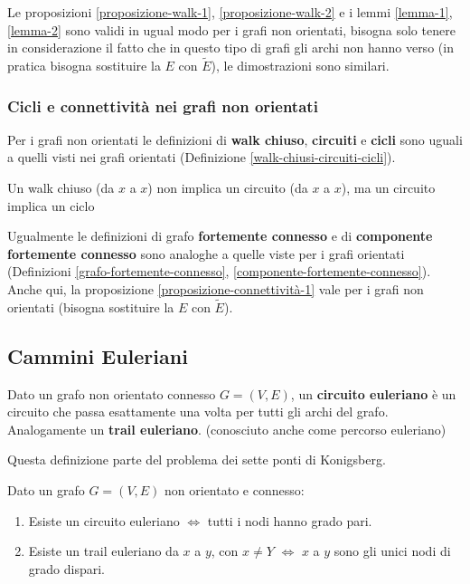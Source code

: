 Le proposizioni \ref{proposizione-walk-1}, \ref{proposizione-walk-2} e i lemmi \ref{lemma-1}, \ref{lemma-2}  sono validi in ugual modo per i grafi non orientati, bisogna solo tenere in considerazione il fatto che in questo tipo di grafi gli archi non hanno verso (in pratica bisogna sostituire la $E$ con $\widetilde{E}$), le dimostrazioni sono similari.

\subsubsection{Cicli e connettività nei grafi non orientati}
Per i grafi non orientati le definizioni di \textbf{walk chiuso}, \textbf{circuiti} e \textbf{cicli} sono uguali a quelli visti nei grafi orientati (Definizione \ref{walk-chiusi-circuiti-cicli}).
\begin{note}
Un walk chiuso (da $x$ a $x$) non implica un circuito (da $x$ a $x$), ma un circuito implica un ciclo
\end{note}
Ugualmente le definizioni di grafo \textbf{fortemente connesso} e  di \textbf{componente fortemente connesso} sono analoghe a quelle viste per i grafi orientati (Definizioni \ref{grafo-fortemente-connesso}, \ref{componente-fortemente-connesso}).\\
Anche qui, la proposizione \ref{proposizione-connettività-1} vale  per i grafi non orientati (bisogna sostituire la $E$ con $\widetilde{E}$).


\subsection{Cammini Euleriani}
\begin{definition}
    Dato un grafo non orientato connesso $G = (V,E)$, un \textbf{circuito euleriano} è un circuito che passa esattamente una volta per tutti gli archi del grafo. Analogamente un \textbf{trail euleriano}. (conosciuto anche come percorso euleriano)
\end{definition}
Questa definizione parte del problema dei sette ponti di Konigsberg.
\begin{theorem}
Dato un grafo $G = (V,E)$ non orientato e connesso:
\begin{enumerate}
    \item Esiste un circuito euleriano $\Longleftrightarrow$ tutti i nodi hanno grado pari.
    \item Esiste un trail euleriano da $x$ a $y$, con $x \neq Y$ $\Longleftrightarrow$ $x$ a $y$ sono gli unici nodi di grado dispari.
\end{enumerate}
\end{theorem}


